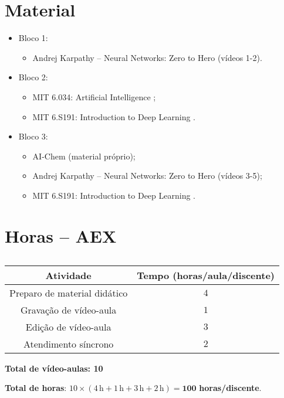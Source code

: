 \documentclass[a4paper,12pt, brazil]{article}
\begin{document}
        
    \section*{Material}
    \begin{itemize}
        \item Bloco 1:
        \begin{itemize}
            \item Andrej Karpathy -- Neural Networks: Zero to Hero \cite{karpathy} (vídeos 1-2).
        \end{itemize}
        
        \item Bloco 2:
        \begin{itemize}
            \item MIT 6.034: Artificial Intelligence \cite{mit_ai};
            \item MIT 6.S191: Introduction to Deep Learning \cite{mit_deep_learning}.
        \end{itemize}
        
        \item Bloco 3:
        \begin{itemize}
            \item AI-Chem (material próprio);
            \item Andrej Karpathy -- Neural Networks: Zero to Hero \cite{karpathy} (vídeos 3-5);
            \item MIT 6.S191: Introduction to Deep Learning \cite{mit_deep_learning}.
        \end{itemize}
    
    \end{itemize}    
    
    \section*{Horas -- AEX}
    \begin{table}[h!]
        \centering
        \begin{tabular}{cc}
            \toprule
            \textbf{Atividade} & \textbf{Tempo (horas/aula/discente)} \\
            \midrule
            Preparo de material didático & $4$ \\
            Gravação de vídeo-aula & $1$ \\
            Edição de vídeo-aula & $3$ \\
            Atendimento síncrono & $2$ \\
            \bottomrule
        \end{tabular}
        \caption{}
        \label{tbl:horas-de-extensao}
    \end{table}
    \textbf{Total de vídeo-aulas: 10}

    \textbf{Total de horas}: $10\times(4\,\text{h} + 1\,\text{h} + 3\,\text{h} + 2\,\text{h}) = \boldsymbol{100}$ \textbf{horas/discente}.
    
    \printbibliography
\end{document}
